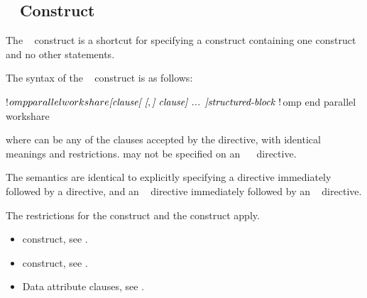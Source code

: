 \vspace{3\baselineskip}
\begin{fortranspecific}
\vspace{-1\baselineskip}
\subsection{~ Construct}
\label{subsec:parallel workshare Construct}
\summary
The ~ construct is a shortcut for specifying a 
construct containing one  construct and no other statements.

\syntax
The syntax of the ~ construct is as follows:

\begin{ompfPragma}
!$omp parallel workshare \plc{[clause[ [},\plc{] clause] ... ]}
   \plc{structured-block }
!$omp end parallel workshare
\end{ompfPragma}

where  can be any of the clauses accepted by the  directive, with
identical meanings and restrictions.  may not be specified on an
~~ directive.

\descr
The semantics are identical to explicitly specifying a  directive immediately
followed by a  directive, and an ~ directive immediately
followed by an ~ directive.

\restrictions
The restrictions for the  construct and the  construct apply.

\crossreferences
\begin{itemize}
\item {} construct, see
.

\item {} construct, see
.

\item Data attribute clauses, see
.
\end{itemize}
\end{fortranspecific}










